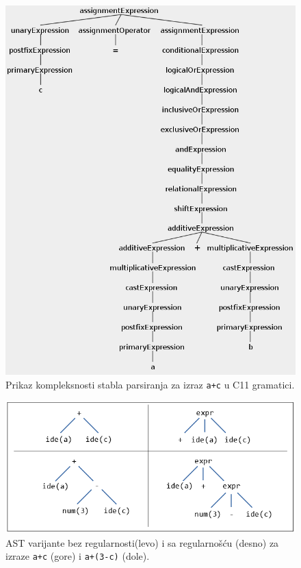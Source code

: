 \begin{figure}[h!]
\centering
\includegraphics[scale=0.55]{images/parse_tree_expr.png}
\caption{Prikaz kompleksnosti stabla parsiranja za izraz 
\texttt{a+c} u C11 gramatici.} 
\label{fig:CompilationProcessPars1}
\end{figure}

\begin{figure}[h!]
\centering
\includegraphics[scale=0.7]{images/ast.png}
\caption{AST varijante bez regularnosti(levo) i sa regularnošću (desno) za izraze \texttt{a+c} (gore) i \texttt{a+(3-c)} (dole).} 
\label{fig:ASTVariants}
\end{figure}

